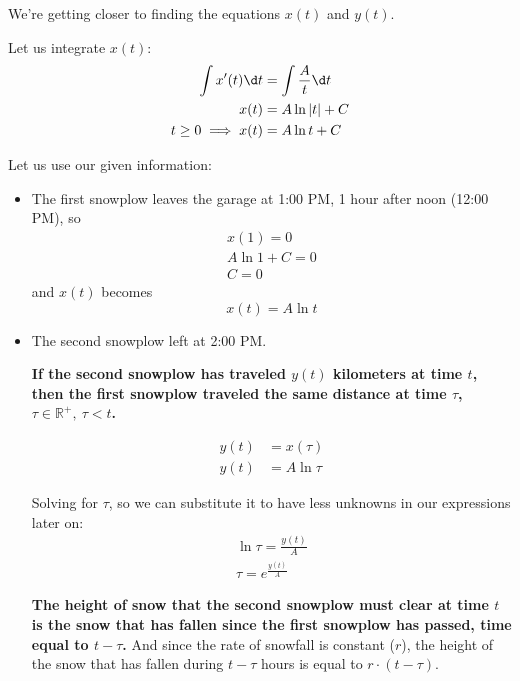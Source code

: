 \documentclass[a4paper,12pt]{article}
\begin{document}
        We're getting closer to finding the equations $x(t)$ and $y(t)$.

        \hfill \break
        Let us integrate $x(t)$:
        \begin{align*}
            \int x'(t) \d t &= \int{\frac{A}{t}} \d t \\
            x(t) &= A \ln |t|+C \\
            t \geq 0 \implies x(t) &= A \ln t + C
        \end{align*}
        
        Let us use our given information:
        \begin{itemize}
            \item The first snowplow leaves the garage at 1:00 PM, 1 hour after noon (12:00 PM), so
                \begin{gather*}
                    x(1) = 0 \\
                    A \ln 1 +C = 0 \\
                    C = 0
                \end{gather*}
                and $x(t)$ becomes
                \begin{equation}
                    x(t) = A \ln t
                    \label{eq:x(t)}
                \end{equation}

            \item The second snowplow left at 2:00 PM.

            \textbf{If the second snowplow has traveled $y(t)$ kilometers at time $t$, then the first snowplow traveled the same distance at time $\tau$, $\tau \in \mathbb{R^+}, \ \tau < t$.}

            \begin{align*}
                y(t) &= x(\tau) \\
                y(t) &= A \ln \tau
            \end{align*}

            Solving for $\tau$, so we can substitute it to have less unknowns in our expressions later on:
            \begin{gather*}
                \ln \tau = \frac{y(t)}{A} \\
                \tau = e^{\frac{y(t)}{A}}
            \end{gather*}

            \textbf{The height of snow that the second snowplow must clear at time $t$ is the snow that has fallen since the first snowplow has passed, time equal to $t - \tau$.} And since the rate of snowfall is constant ($r$), the height of the snow that has fallen during \(t-\tau\) hours is equal to \(r \cdot (t - \tau)\).


\end{itemize}
\end{document}
